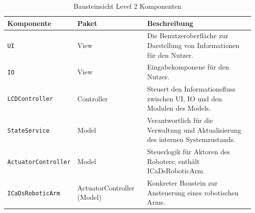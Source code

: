 \begin{table}[htbp]
\centering
\begin{tabular}{|l|l|p{8cm}|}
\hline
\textbf{Komponente} & \textbf{Paket} & \textbf{Beschreibung} \\
\hline
\texttt{UI} & View & Die Benutzeroberfläche zur Darstellung von Informationen für den Nutzer. \\
\hline
\texttt{IO} & View & Eingabekomponene für den Nutzer. \\
\hline
\texttt{LCDController} & Controller & Steuert den Informationsfluss zwischen UI, IO und den Modulen des Models. \\
\hline
\texttt{StateService} & Model & Verantwortlich für die Verwaltung und Aktualisierung des internen Systemzustands. \\
\hline
\texttt{ActuatorController} & Model & Steuerlogik für Aktoren des Roboters; enthält ICaDsRoboticArm. \\
\hline
\texttt{ICaDsRoboticArm} & ActuatorController (Model) & Konkreter Baustein zur Ansteuerung eines robotischen Arms. \\
\hline
\end{tabular}
\caption{Bausteinsicht Level 2 Komponenten}
\label{tab:whitebox-komponenten}
\end{table}



